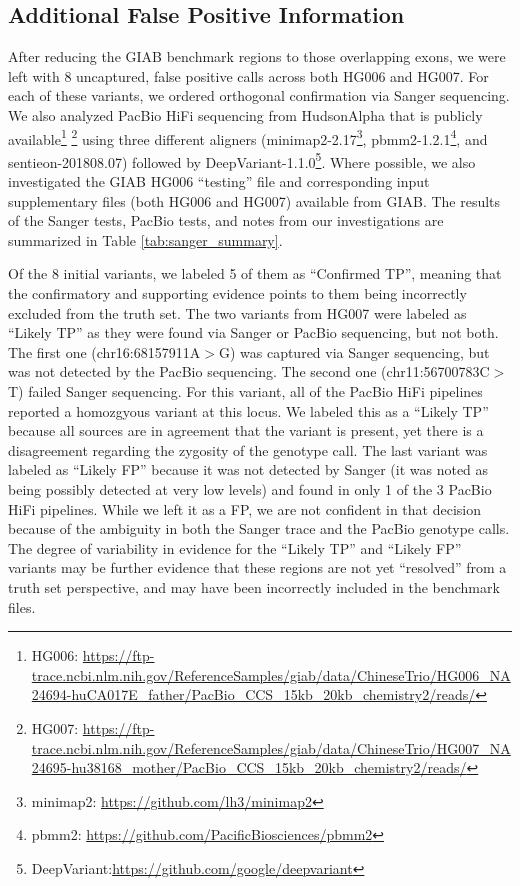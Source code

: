 \subsection{Additional False Positive Information}
After reducing the GIAB benchmark regions to those overlapping exons, we were left with 8 uncaptured, false positive calls across both HG006 and HG007.
For each of these variants, we ordered orthogonal confirmation via Sanger sequencing. 
We also analyzed PacBio HiFi sequencing from HudsonAlpha that is publicly available\footnote{HG006: \url{https://ftp-trace.ncbi.nlm.nih.gov/ReferenceSamples/giab/data/ChineseTrio/HG006_NA24694-huCA017E_father/PacBio_CCS_15kb_20kb_chemistry2/reads/}}
\footnote{HG007: \url{https://ftp-trace.ncbi.nlm.nih.gov/ReferenceSamples/giab/data/ChineseTrio/HG007_NA24695-hu38168_mother/PacBio_CCS_15kb_20kb_chemistry2/reads/}}
using three different aligners (minimap2-2.17\footnote{minimap2: \url{https://github.com/lh3/minimap2}}, pbmm2-1.2.1\footnote{pbmm2: \url{https://github.com/PacificBiosciences/pbmm2}}, and sentieon-201808.07) followed by DeepVariant-1.1.0\footnote{DeepVariant:\url{https://github.com/google/deepvariant}}.
Where possible, we also investigated the GIAB HG006 ``testing'' file and corresponding input supplementary files (both HG006 and HG007) available from GIAB.
The results of the Sanger tests, PacBio tests, and notes from our investigations are summarized in Table \ref{tab:sanger_summary}.

Of the 8 initial variants, we labeled 5 of them as ``Confirmed TP'', meaning that the confirmatory and supporting evidence points to them being incorrectly excluded from the truth set.
The two variants from HG007 were labeled as ``Likely TP'' as they were found via Sanger or PacBio sequencing, but not both.
The first one (chr16:68157911A$>$G) was captured via Sanger sequencing, but was not detected by the PacBio sequencing.
The second one (chr11:56700783C$>$T) failed Sanger sequencing.
For this variant, all of the PacBio HiFi pipelines reported a homozgyous variant at this locus.
We labeled this as a ``Likely TP'' because all sources are in agreement that the variant is present, yet there is a disagreement regarding the zygosity of the genotype call.
The last variant was labeled as ``Likely FP'' because it was not detected by Sanger (it was noted as being possibly detected at very low levels) and found in only 1 of the 3 PacBio HiFi pipelines.
While we left it as a FP, we are not confident in that decision because of the ambiguity in both the Sanger trace and the PacBio genotype calls.
The degree of variability in evidence for the ``Likely TP'' and ``Likely FP'' variants may be further evidence that these regions are not yet ``resolved'' from a truth set perspective, and may have been incorrectly included in the benchmark files. 

